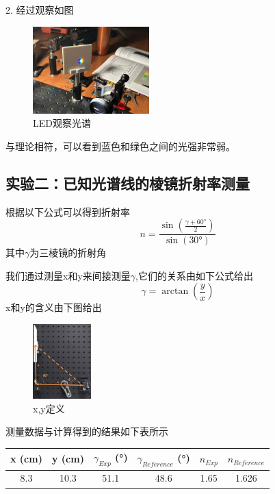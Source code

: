 \documentclass{ctexart}
\begin{document}
2. 经过观察如图
\begin{figure}[H]
    \centering
    \includegraphics[width=0.4\textwidth,height=0.2\textwidth]{pictures/微信图片_20241121154923.jpg}
    \caption{LED观察光谱}
\end{figure}
与理论相符，可以看到蓝色和绿色之间的光强非常弱。

\subsection{实验二：已知光谱线的棱镜折射率测量}
根据以下公式可以得到折射率
\begin{equation}
    n = \frac{\sin(\frac{\gamma + 60°}{2})}{\sin(30°)}
\end{equation}
其中$\gamma$为三棱镜的折射角

我们通过测量x和y来间接测量$\gamma$,它们的关系由如下公式给出
\begin{equation}
    \gamma = \arctan(\frac{y}{x})
\end{equation}
x和y的含义由下图给出
\begin{figure}[H]
    \centering
    \includegraphics[width=0.2\textwidth,height=0.3\textwidth]{pictures/xy示意图.png}
    \caption{x,y定义}
\end{figure}
测量数据与计算得到的结果如下表所示
\begin{table}[h]
    \centering
    \begin{tabular}{|c|c|c|c|c|c|}
        \hline
        \rowcolor{yellow!25} x (cm) & y (cm) & $\gamma_{Exp}$ (°) & $\gamma_{Reference}$ (°) & $n_{Exp}$  & $n_{Reference}$  \\
        \hline
        8.3 & 10.3 & 51.1 & 48.6 & 1.65 & 1.626 \\
        \hline
    \end{tabular}
\end{table}
\end{document}
